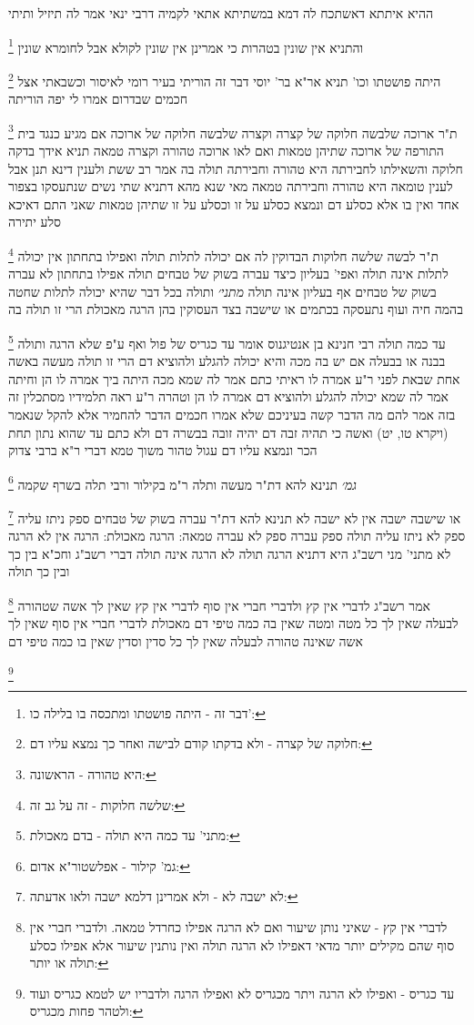 \documentclass[12pt, openany]{book}
\newcommand{\footnotecomment}[1]{
	\renewcommand\thefootnote{}
	\footnote{#1}}
\newcommand{\commenta}[1]{\footnotecomment{#1}}
\begin{document}
{{}
ההיא איתתא דאשתכח לה דמא במשתיתא אתאי לקמיה דרבי ינאי אמר לה תיזיל ותיתי 
\commenta{דבר זה - היתה פושטתו ומתכסה בו בלילה כו':}
והתניא אין שונין בטהרות כי אמרינן אין שונין לקולא אבל לחומרא שונין
\commenta{חלוקה של קצרה - ולא בדקתו קודם לבישה ואחר כך נמצא עליו דם:}
היתה פושטתו וכו' תניא אר"א בר' יוסי דבר זה הוריתי בעיר רומי לאיסור וכשבאתי אצל חכמים שבדרום אמרו לי יפה הוריתה 
\commenta{היא טהורה - הראשונה:}
ת"ר ארוכה שלבשה חלוקה של קצרה וקצרה שלבשה חלוקה של ארוכה אם מגיע כנגד בית התורפה של ארוכה שתיהן טמאות ואם לאו ארוכה טהורה וקצרה טמאה 
תניא אידך בדקה חלוקה והשאילתו לחבירתה היא טהורה וחבירתה תולה בה אמר רב ששת ולענין דינא תנן אבל לענין טומאה היא טהורה וחבירתה טמאה
מאי שנא מהא דתניא שתי נשים שנתעסקו בצפור אחד ואין בו אלא כסלע דם ונמצא כסלע על זו וכסלע על זו שתיהן טמאות שאני התם דאיכא סלע יתירה 
\commenta{שלשה חלוקות - זה על גב זה:}
ת"ר לבשה שלשה חלוקות הבדוקין לה אם יכולה לתלות תולה ואפילו בתחתון אין יכולה לתלות אינה תולה ואפי' בעליון 
כיצד עברה בשוק של טבחים תולה אפילו בתחתון לא עברה בשוק של טבחים אף בעליון אינה תולה
{\large\emph{מתני׳}} ותולה בכל דבר שהיא יכולה לתלות שחטה בהמה חיה ועוף נתעסקה בכתמים או שישבה בצד העסוקין בהן הרגה מאכולת הרי זו תולה בה 
\commenta{מתני' עד כמה היא תולה - בדם מאכולת:}
עד כמה תולה רבי חנינא בן אנטיגנוס אומר עד כגריס של פול ואף ע"פ שלא הרגה ותולה בבנה או בבעלה אם יש בה מכה והיא יכולה להגלע ולהוציא דם הרי זו תולה 
מעשה באשה אחת שבאת לפני ר"ע אמרה לו ראיתי כתם אמר לה שמא מכה היתה ביך אמרה לו הן וחיתה אמר לה שמא יכולה להגלע ולהוציא דם אמרה לו הן וטהרה ר"ע 
ראה תלמידיו מסתכלין זה בזה אמר להם מה הדבר קשה בעיניכם שלא אמרו חכמים הדבר להחמיר אלא להקל שנאמר (ויקרא טו, יט) ואשה כי תהיה זבה דם יהיה זובה בבשרה דם ולא כתם 
עד שהוא נתון תחת הכר ונמצא עליו דם עגול טהור משוך טמא דברי ר"א ברבי צדוק
\commenta{גמ' קילור - אפלשטור"א אדום:}
{\large\emph{גמ׳}} תנינא להא דת"ר מעשה ותלה ר"מ בקילור ורבי תלה בשרף שקמה
\commenta{לא ישבה לא - ולא אמרינן דלמא ישבה ולאו אדעתה:}
או שישבה ישבה אין לא ישבה לא 
תנינא להא דת"ר עברה בשוק של טבחים ספק ניתז עליה ספק לא ניתז עליה תולה ספק עברה ספק לא עברה טמאה:
הרגה מאכולת: הרגה אין לא הרגה לא מתני' מני רשב"ג היא דתניא הרגה תולה לא הרגה אינה תולה דברי רשב"ג וחכ"א בין כך ובין כך תולה 
\commenta{לדברי אין קץ - שאיני נותן שיעור ואם לא הרגה אפילו כחרדל טמאה. ולדברי חברי אין סוף שהם מקילים יותר מדאי דאפילו לא הרגה תולה ואין נותנין שיעור אלא אפילו כסלע תולה או יותר:}
אמר רשב"ג לדברי אין קץ ולדברי חברי אין סוף 
לדברי אין קץ שאין לך אשה שטהורה לבעלה שאין לך כל מטה ומטה שאין בה כמה טיפי דם מאכולת 
לדברי חברי אין סוף שאין לך אשה שאינה טהורה לבעלה שאין לך כל סדין וסדין שאין בו כמה טיפי דם 
\commenta{עד כגריס - ואפילו לא הרגה ויתר מכגריס לא ואפילו הרגה ולדבריו יש לטמא כגריס ועוד ולטהר פחות מכגריס:}
}
\end{document}
